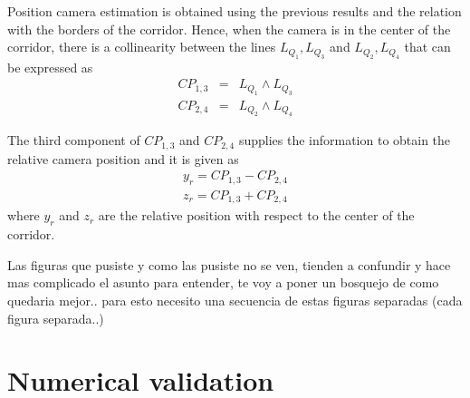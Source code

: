 \color{blue}

Position camera estimation is obtained using the previous results and the relation with the borders of the corridor. Hence, when the camera is in the center of the corridor, there is a collinearity
between the lines $L_{Q_1},L_{Q_3}$ and $L_{Q_2},L_{Q_4}$ that can be expressed as
\begin{eqnarray}
		   CP_{1,3} &=& L_{Q_1}\wedge L_{Q_3} \label{crossLines13} \\
		   CP_{2,4} &= & L_{Q_2}\wedge L_{Q_4} \label{crossLines24}
\end{eqnarray}

The third component of $CP_{1,3}$ and $CP_{2,4}$ supplies the information to obtain the relative camera position and it is given as
\begin{eqnarray}
		y_r=CP_{1,3}-CP_{2,4} \label{relaitve_x} \\
z_r=CP_{1,3}+CP_{2,4} \label{realitive_z}
\end{eqnarray}
where $y_r$ and $z_r$ are the relative position with respect to the center of the corridor. \\

\color{black}

\color{red}
Las figuras que pusiste y como las pusiste no se ven, tienden a confundir y hace mas complicado el asunto para entender, te voy a poner un bosquejo de como quedaria mejor..
para esto necesito una secuencia de estas figuras separadas (cada figura separada..)
\color{blue}

\section{Numerical validation}
%
%
%
%
%

